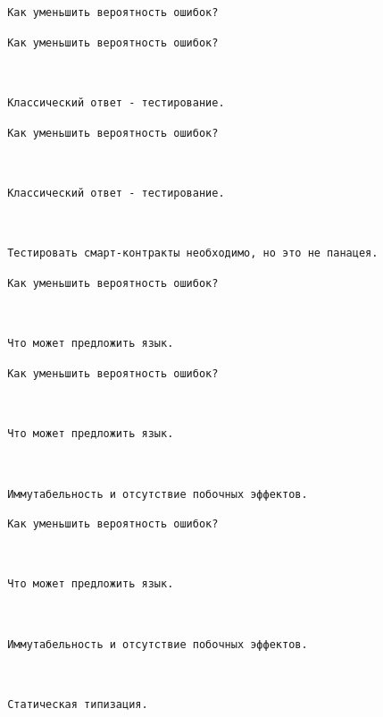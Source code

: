 \documentclass[11pt,handout,pdf,hyperref={unicode}]{beamer}
\begin{document}
\begin{frame}[fragile]

\texttt{ Как уменьшить вероятность ошибок? }

\end{frame}

\begin{frame}[fragile]

\texttt{ Как уменьшить вероятность ошибок? }

\texttt{ }

\texttt{ Классический ответ - тестирование. }

\end{frame}

\begin{frame}[fragile]

\texttt{ Как уменьшить вероятность ошибок? }

\texttt{ }

\texttt{ Классический ответ - тестирование. }

\texttt{ }

\texttt{ Тестировать смарт-контракты необходимо, но это не панацея. }

\end{frame}

\begin{frame}[fragile]

\texttt{ Как уменьшить вероятность ошибок? }

\texttt{ }

\texttt{ Что может предложить язык. }

\end{frame}

\begin{frame}[fragile]

\texttt{ Как уменьшить вероятность ошибок? }

\texttt{ }

\texttt{ Что может предложить язык. }

\texttt{ }

\texttt{ Иммутабельность и отсутствие побочных эффектов. }

\end{frame}

\begin{frame}[fragile]

\texttt{ Как уменьшить вероятность ошибок? }

\texttt{ }

\texttt{ Что может предложить язык. }

\texttt{ }

\texttt{ Иммутабельность и отсутствие побочных эффектов. }

\texttt{ }

\texttt{ Статическая типизация. }

\end{frame}
\end{document}
